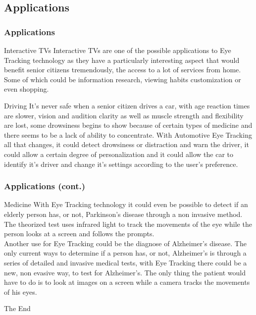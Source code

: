 \documentclass{beamer}
\begin{document}
\subsection{Applications}

\begin{frame}
\frametitle{Applications}
\begin{block}{Interactive TVs}
Interactive TVs are one of the possible applications to Eye Tracking technology as they have a particularly interesting aspect that would benefit senior citizens tremendously, the access to a lot of services from home. \\
Some of which could be information research, viewing habits customization or even shopping.
\end{block}
\begin{block}{Driving}
It's never safe when a senior citizen drives a car, with age reaction times are slower, vision  and audition clarity as well as muscle strength and flexibility are lost, some drowsiness begins to show because of certain types of medicine and there seems to be a lack of ability to concentrate. With Automotive Eye Tracking all that changes, it could detect drowsiness or distraction and warn the driver, it could allow a certain degree of personalization and it could allow the car to identify it's driver and change it's settings according to the user's preference.
\end{block}
\end{frame}


\begin{frame}
\frametitle{Applications (cont.)}
\begin{block}{Medicine}
With Eye Tracking technology it could even be possible to detect if an elderly person has, or not, Parkinson's disease through a non invasive method. The theorized test uses infrared light to track the movements of the eye while the person looks at a screen and follows the prompts. \\
Another use for Eye Tracking could be the diagnose of Alzheimer's disease. The only current ways to determine if a person has, or not, Alzheimer's is through a series of detailed and invasive medical tests, with Eye Tracking there could be a new, non evasive way, to test for Alzheimer's. The only thing the patient would have to do is to look at images on a screen while a camera tracks the movements of his eyes. 
\end{block}
\end{frame}


\begin{frame}
\Huge{\centerline{The End}}
\end{frame}

\end{document}
